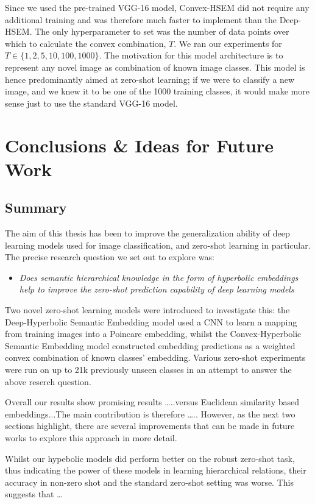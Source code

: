 \documentclass[12pt]{report}
\begin{document}
Since we used the pre-trained VGG-16 model, Convex-HSEM did not require any additional training and was therefore much faster to implement than the Deep-HSEM. The only hyperparameter to set was the number of data points over which to calculate the convex combination, $T$. We ran our experiments for 
$T \in \{1, 2, 5, 10, 100, 1000\}$. The motivation for this model architecture is to represent any novel image as combination of known image classes. This model is hence predominantly aimed at zero-shot learning; if we were to classify a new image, and we knew it to be one of the 1000 training classes, it would make more sense just to use the standard VGG-16 model.

\newpage
\chapter{Conclusions \& Ideas for Future Work}

\section{Summary}
The aim of this thesis has been to improve the generalization ability of deep learning models used for image classification, and zero-shot learning in particular. The precise research question we set out to explore was: 
\begin{itemize}
\item \textit{Does semantic hierarchical knowledge in the form of hyperbolic embeddings help to improve the zero-shot prediction capability of deep learning models}
\end{itemize}
Two novel zero-shot learning models were introduced to investigate this: the Deep-Hyperbolic Semantic Embedding model used a CNN to learn a mapping from training images into a Poincare embedding, whilst the Convex-Hyperbolic Semantic Embedding model constructed embedding predictions as a weighted convex combination of known classes' embedding. Various zero-shot experiments were run on up to 21k previously unseen classes in an attempt to answer the above reserch question.

Overall our results show promising results \dots..versus Euclidean similarity based embeddings...The main contribution is therefore \dots.. However, as the next two sections highlight, there are several improvements that can be made in future works to explore this approach in more detail.

Whilst our hypebolic models did perform better on the robust zero-shot task, thus indicating the power of these models in learning hierarchical relations, their accuracy in non-zero shot and the standard zero-shot setting was worse. This suggests that \dots 
\end{document}
